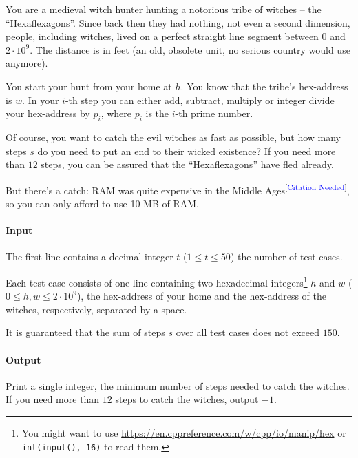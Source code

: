 
\usepackage{hyperref}



\makeheader

You are a medieval witch hunter hunting a notorious tribe of witches -- the “\underline{Hex}aflexagons”.
Since back then they had nothing, not even a second dimension, people, including witches, lived
on a perfect straight line segment between $0$ and $2 \cdot 10^9$. The distance is in feet (an old, obsolete unit,
no serious country would use anymore).

You start your hunt from your home at $h$. You know that the tribe's hex-address is $w$.
In your $i$-th step you can either add, subtract, multiply or integer divide your hex-address by $p_i$,
where $p_i$ is the $i$-th prime number.

Of course, you want to catch the evil witches as fast as possible, but
how many steps $s$ do you need to put an end to their wicked existence?
If you need more than $12$ steps, you can be assured that
the “\underline{Hex}aflexagons” have fled already.

But there's a catch:
RAM was quite expensive in the Middle Ages\textsuperscript{[\textcolor{blue}{Citation Needed}]},
so you can only afford to use 10 MB of RAM.

\paragraph*{Input}

The first line contains a decimal integer $t$ ($1\leq t\leq 50$) the number of test cases.

Each test case consists of one line containing two hexadecimal integers\footnote{You might want to use \url{https://en.cppreference.com/w/cpp/io/manip/hex} or \texttt{int(input(), 16)} to read them.}
$h$ and $w$ ($0 \leq h, w \leq 2\cdot 10^9$), the hex-address of your home and the hex-address of the witches, respectively, separated by a space.

It is guaranteed that the sum of steps $s$ over all test cases does not exceed $150$.

\paragraph*{Output}

Print a single integer, the minimum number of steps needed to catch the witches.
If you need more than $12$ steps to catch the witches, output $-1$.

\begin{samples}
\end{samples}

